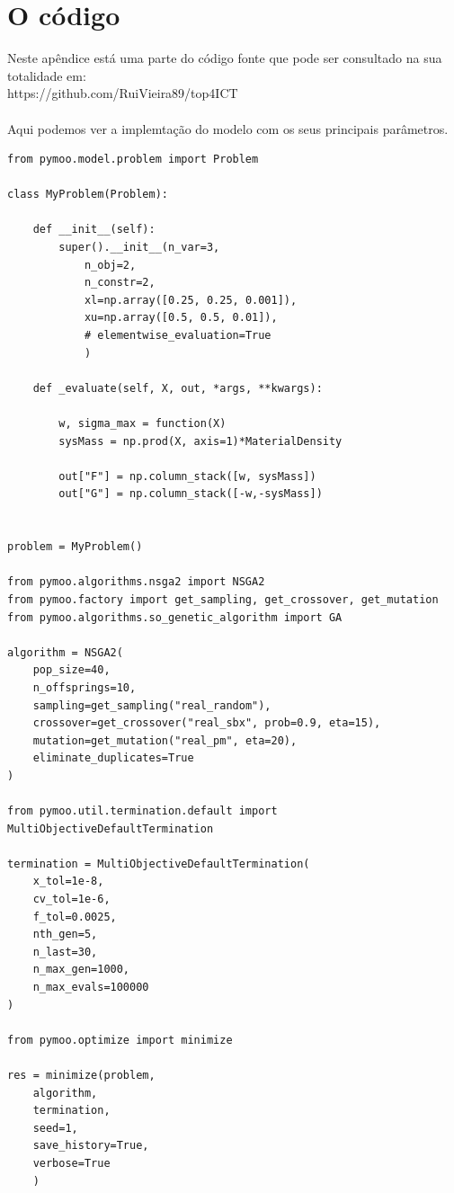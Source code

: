 \documentclass[a4paper,12pt]{article}
\begin{document}
\newpage

\appendix

\section{O código}\label{A:1}

Neste apêndice está uma parte do código fonte que pode ser consultado na sua totalidade em:\\ https://github.com/RuiVieira89/top4ICT\\
\\
Aqui podemos ver a implemtação do modelo com os seus principais parâmetros.

\begin{verbatim}
from pymoo.model.problem import Problem

class MyProblem(Problem):

	def __init__(self):
		super().__init__(n_var=3, 
			n_obj=2,
			n_constr=2,
			xl=np.array([0.25, 0.25, 0.001]),
			xu=np.array([0.5, 0.5, 0.01]),
			# elementwise_evaluation=True
			)

	def _evaluate(self, X, out, *args, **kwargs):

		w, sigma_max = function(X) 
		sysMass = np.prod(X, axis=1)*MaterialDensity

		out["F"] = np.column_stack([w, sysMass])
		out["G"] = np.column_stack([-w,-sysMass])


problem = MyProblem()

from pymoo.algorithms.nsga2 import NSGA2
from pymoo.factory import get_sampling, get_crossover, get_mutation
from pymoo.algorithms.so_genetic_algorithm import GA

algorithm = NSGA2(
	pop_size=40,
	n_offsprings=10,
	sampling=get_sampling("real_random"),
	crossover=get_crossover("real_sbx", prob=0.9, eta=15),
	mutation=get_mutation("real_pm", eta=20),
	eliminate_duplicates=True
)

from pymoo.util.termination.default import MultiObjectiveDefaultTermination

termination = MultiObjectiveDefaultTermination(
    x_tol=1e-8,
    cv_tol=1e-6,
    f_tol=0.0025,
    nth_gen=5,
    n_last=30,
    n_max_gen=1000,
    n_max_evals=100000
)

from pymoo.optimize import minimize

res = minimize(problem, 
	algorithm, 
	termination, 
	seed=1, 
	save_history=True, 
	verbose=True
	)
\end{verbatim}





\end{document}
